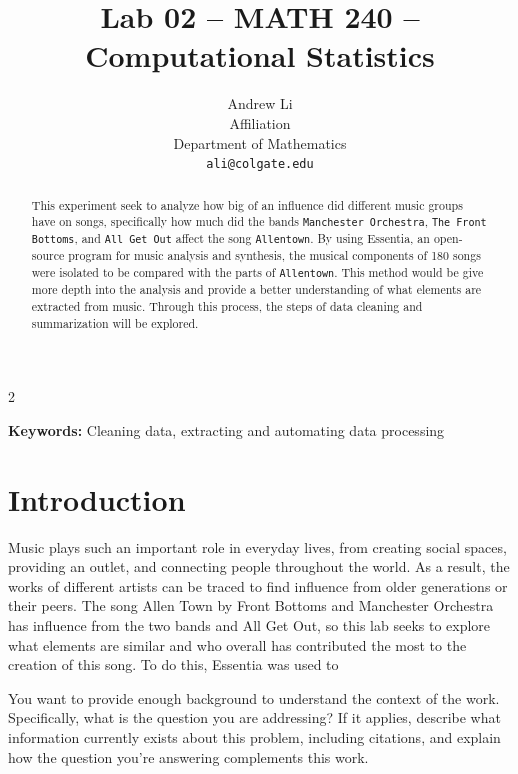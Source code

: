 \documentclass{article}\usepackage[]{graphicx}\usepackage[]{xcolor}
\begin{document}
\vspace{-1in}
\title{Lab 02 -- MATH 240 -- Computational Statistics}

\author{
  Andrew Li \\
  Affiliation  \\
  Department of Mathematics  \\
  {\tt ali@colgate.edu}
}

\date{}

\maketitle

\begin{multicols}{2}
\begin{abstract}
This experiment seek to analyze how big of an influence did different music groups have on songs, specifically how much did the bands \texttt{Manchester Orchestra}, \texttt{The Front Bottoms}, and \texttt{All Get Out} affect the song \texttt{Allentown}. By using Essentia, an open-source program for music analysis and synthesis, the musical components of 180 songs were isolated to be compared with the parts of \texttt{Allentown}. This method would be give more depth into the analysis and provide a better understanding of what elements are extracted from music. Through this process, the steps of data cleaning and summarization will be explored.  

\end{abstract}

\noindent \textbf{Keywords:} Cleaning data, extracting and automating data processing 

\section{Introduction}

Music plays such an important role in everyday lives, from creating social spaces, providing an outlet, and connecting people throughout the world. As a result, the works of different artists can be traced to find influence from older generations or their peers. The song Allen Town by Front Bottoms and Manchester Orchestra has influence from the two bands and All Get Out, so this lab seeks to explore what elements are similar and who overall has contributed the most to the creation of this song. To do this, Essentia was used to 

You want to provide enough background to understand the context of the work. Specifically, what is the question you are addressing? If it applies, describe what information currently exists about this problem, including citations, and explain how the question you're answering complements this work.


\end{multicols}
\end{document}
